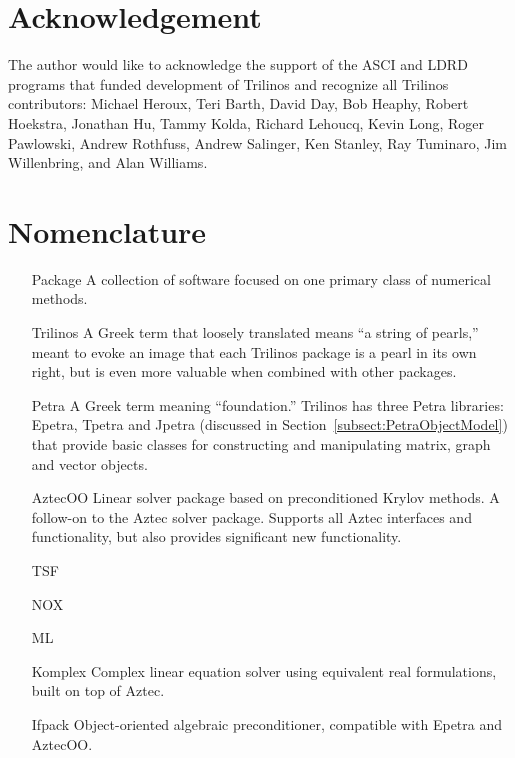 \documentclass[12pt,relax]{SANDreport}
\begin{document}
    \section*{Acknowledgement}
The author would like to acknowledge the support of the ASCI and LDRD 
programs that funded development of Trilinos and recognize all Trilinos 
contributors: Michael Heroux, Teri Barth, David Day, Bob Heaphy, 
Robert Hoekstra, Jonathan Hu, Tammy Kolda, Richard Lehoucq, Kevin Long, 
Roger Pawlowski, Andrew Rothfuss, Andrew Salinger, Ken Stanley, Ray 
Tuminaro, Jim Willenbring, and Alan Williams.

    \clearpage
    \tableofcontents
    \listoffigures
    \listoftables

    \clearpage
    \section*{Nomenclature}
    \begin{itemize}
	\item[Package]
	    A collection of software focused on one primary class of numerical
          methods.
	\item[Trilinos]
	    A Greek term that loosely translated means ``a string of pearls,'' 
          meant to evoke an image that each Trilinos package is a pearl in its 
          own right, but is even more valuable when combined with other 
          packages.
	\item[Petra]
	    A Greek term meaning ``foundation.''  Trilinos has three Petra 
          libraries: Epetra, Tpetra and Jpetra (discussed in 
          Section~\ref{subsect:PetraObjectModel}) that provide basic classes 
          for constructing and manipulating matrix, graph and vector objects.
        \item[AztecOO] 
            Linear solver package based on preconditioned Krylov methods.  A 
          follow-on to the Aztec solver package.  Supports all Aztec 
          interfaces and functionality, but also provides significant new 
          functionality.
	\item[TSF]
	\item[NOX]
	\item[ML]
	\item[Komplex] 
           Complex linear equation solver using equivalent real formulations,
	 built on top of Aztec.
	\item[Ifpack] 
           Object-oriented algebraic preconditioner, compatible with Epetra and
	 AztecOO.
    \end{itemize}
\end{document}
